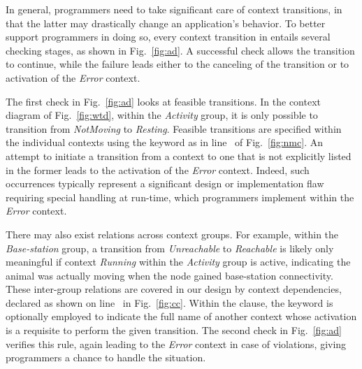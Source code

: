 
In general, programmers need to take significant care of context
transitions, in that the latter may drastically change an
application's behavior. To better support programmers in doing so,
every context transition in \conesc entails several checking stages,
as shown in Fig.~\ref{fig:ad}. A successful check allows the
transition to continue, while the failure leads either to the
canceling of the transition or to activation of the \emph{Error}
context. %

The first check in Fig.~\ref{fig:ad} looks at feasible transitions. In
the context diagram of Fig.~\ref{fig:wtd}, within the \emph{Activity}
group, it is only possible to transition from \emph{NotMoving} to
\emph{Resting}. Feasible transitions are specified within the
individual contexts using the keyword  as in
line~ of Fig.~\ref{fig:nmc}. An attempt to
initiate a transition from a context to one that is not
explicitly listed in the former leads to the activation of the
\emph{Error} context. Indeed, such occurrences typically represent a
significant design or implementation flaw requiring special handling
at run-time, which programmers implement within the \emph{Error} context.


There may also exist relations across context groups. For example,
within the \emph{Base-station} group, a transition from
\emph{Unreachable} to \emph{Reachable} is likely only meaningful if
context \emph{Running} within the \emph{Activity} group is active,
indicating the animal was actually moving when the node gained
base-station connectivity. These inter-group relations are covered in
our design by context dependencies, declared as shown on
line~ in Fig.~\ref{fig:cc}. Within the
 clause, the keyword  is optionally
employed to indicate the full name of another context whose activation
is a requisite to perform the given transition. The second check in
Fig.~\ref{fig:ad} verifies this rule, again leading to the
\emph{Error} context in case of violations, giving programmers a
chance to handle the situation.

